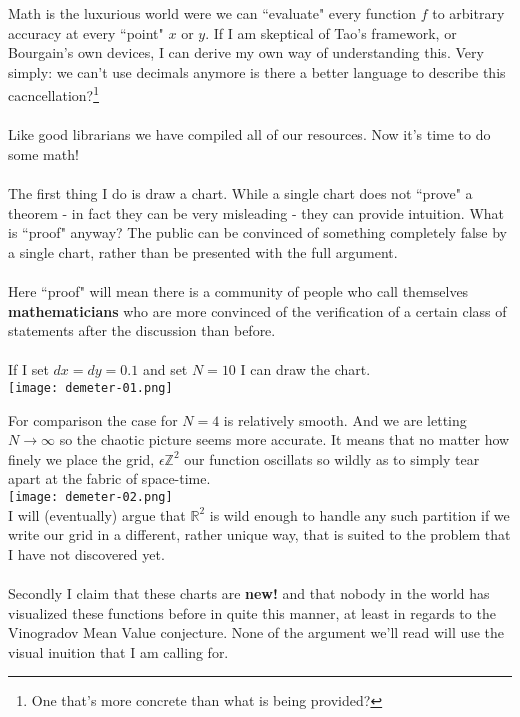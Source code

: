 \documentclass[12pt]{article}
\begin{document}
\newpage
\noindent Math is the luxurious world were we can ``evaluate" every function $f$ to arbitrary accuracy at every ``point" $x$ or $y$.  If I am skeptical of Tao's framework, or Bourgain's own devices, I can derive my own way of understanding this.  Very simply: we can't use decimals anymore is there a better language to describe this cacncellation?\footnote{One that's more concrete than what is being provided?} \\ \\
Like good librarians we have compiled all of our resources.  Now it's time to do some math! \\ \\
The first thing I do is draw a chart.  While a single chart does not ``prove" a theorem - in fact they can be very misleading - they can provide intuition.  What is ``proof" anyway?  The public can be convinced of something completely false by a single chart, rather than be presented with the full argument.  \\ \\
Here ``proof" will mean there is a community of people who call themselves \textbf{mathematicians}  who are more convinced of the verification of a certain class of statements after the discussion than before. \\ \\
If I set $dx = dy = 0.1$ and set $N = 10$ I can draw the chart. \\
\texttt{[image: demeter-01.png]}

\newpage

\noindent For comparison the case for $N = 4$ is relatively smooth.  And we are letting $N \to \infty$ so the chaotic picture seems more accurate.  It means that no matter how finely we place the grid, $\epsilon \mathbb{Z}^2  $ our function oscillats so wildly as to simply tear apart at the fabric of space-time. \\

\texttt{[image: demeter-02.png]}  \\ 
I will (eventually) argue that $\mathbb{R}^2$ is wild enough to handle any such partition if we write our grid in a different, rather unique way, that is suited to the problem that I have not discovered yet. \\ \\
Secondly I claim that these charts are \textbf{new!} and that nobody in the world has {\color{green!50!red} visualized} these functions before in quite this manner, at least in regards to the Vinogradov Mean Value conjecture.  None of the argument we'll read will use the visual inuition that I am calling for.
\end{document}
